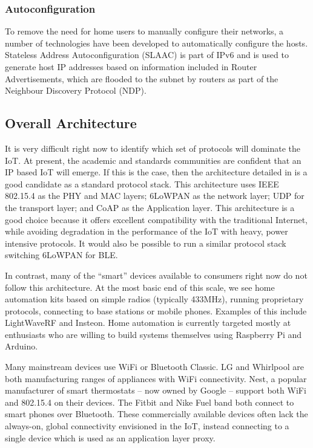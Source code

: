 \documentclass[10pt,journal,compsoc]{IEEEtran}
\begin{document}
\subsubsection{Autoconfiguration}
To remove the need for home users to manually configure their networks, a number of
technologies have been developed to automatically configure the hosts.
Stateless Address Autoconfiguration (SLAAC) is part of IPv6 and is used to
generate host IP addresses based on information included in Router
Advertisements, which are flooded to the subnet by routers as part of the
Neighbour Discovery Protocol (NDP). 

\subsection{Overall Architecture}
It is very difficult right now to identify which set of protocols will dominate
the IoT. At present, the academic and standards communities are confident that
an IP based IoT will emerge. If this is the case, then the architecture
detailed in \cite{Palattella2013} is a good candidate as a standard protocol
stack. This architecture uses IEEE 802.15.4 as the PHY and MAC layers; 6LoWPAN
as the network layer; UDP for the transport layer; and CoAP as the Application
layer. This architecture is a good choice because it offers excellent
compatibility with the traditional Internet, while avoiding degradation in the
performance of the IoT with heavy, power intensive protocols. It would also be
possible to run a similar protocol stack switching 6LoWPAN for BLE. 

In contrast, many of the ``smart'' devices available to consumers right now do
not follow this architecture. At the most basic end of this scale, we see home
automation kits based on simple radios (typically 433MHz), running proprietary
protocols, connecting to base stations or mobile phones. Examples of this
include LightWaveRF and Insteon. Home automation is currently targeted mostly
at enthusiasts who are willing to build systems themselves using Raspberry Pi
and Arduino.  

Many mainstream devices use WiFi or Bluetooth Classic. LG and Whirlpool are
both manufacturing ranges of appliances with WiFi connectivity. Nest, a popular
manufacturer of smart thermostats -- now owned by Google -- support both WiFi
and 802.15.4 on their devices. The Fitbit and Nike Fuel band both connect to
smart phones over Bluetooth. These commercially available devices often lack
the always-on, global connectivity envisioned in the IoT, instead connecting
to a single device which is used as an application layer proxy.
\end{document}
